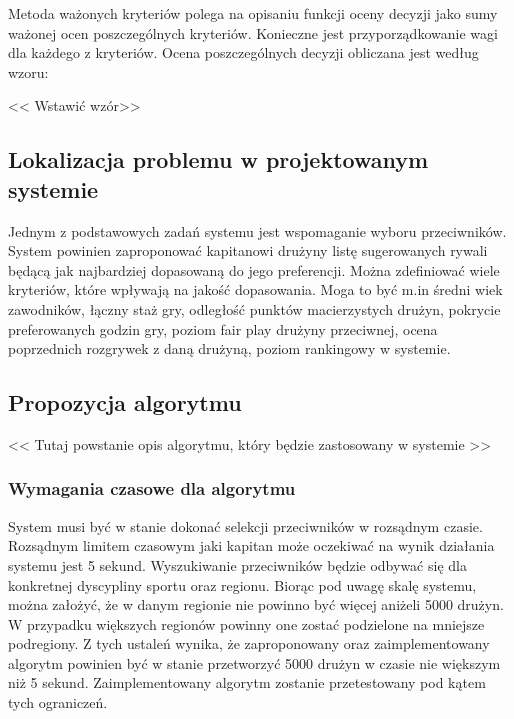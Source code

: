 \documentclass[a4paper,11pt]{article}
\begin{document}
Metoda ważonych kryteriów polega na opisaniu funkcji oceny decyzji jako sumy ważonej ocen poszczególnych kryteriów. Konieczne jest przyporządkowanie wagi dla każdego z kryteriów. Ocena poszczególnych decyzji obliczana jest według wzoru: 

<< Wstawić wzór>>

\subsection{Lokalizacja problemu w projektowanym systemie}

Jednym z podstawowych zadań systemu jest wspomaganie wyboru przeciwników. System powinien zaproponować kapitanowi drużyny listę sugerowanych rywali będącą jak najbardziej dopasowaną do jego preferencji. Można zdefiniować wiele kryteriów, które wpływają na jakość dopasowania. Moga to być m.in średni wiek zawodników, łączny staż gry, odległość punktów macierzystych drużyn, pokrycie preferowanych godzin gry, poziom fair play drużyny przeciwnej, ocena poprzednich rozgrywek z daną drużyną, poziom rankingowy w systemie. 


\subsection{Propozycja algorytmu}

<< Tutaj powstanie opis algorytmu, który będzie zastosowany w systemie >>

\subsubsection{Wymagania czasowe dla algorytmu}

System musi być w stanie dokonać selekcji przeciwników w rozsądnym czasie. Rozsądnym limitem czasowym jaki kapitan może oczekiwać na wynik działania systemu jest 5 sekund. Wyszukiwanie przeciwników będzie odbywać się dla konkretnej dyscypliny sportu oraz regionu. Biorąc pod uwagę skalę systemu, można założyć, że w danym regionie nie powinno być więcej aniżeli 5000 drużyn. W przypadku większych regionów powinny one zostać podzielone na mniejsze podregiony. Z tych ustaleń wynika, że zaproponowany oraz zaimplementowany algorytm powinien być w stanie przetworzyć 5000 drużyn w czasie nie większym niż 5 sekund. Zaimplementowany algorytm zostanie przetestowany pod kątem tych ograniczeń.
\end{document}
